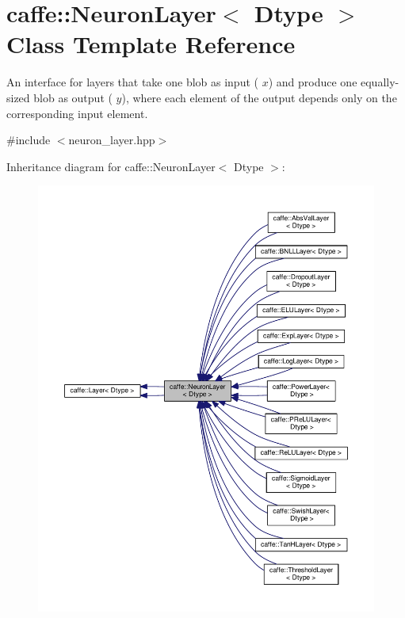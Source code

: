 \hypertarget{classcaffe_1_1_neuron_layer}{}\section{caffe\+:\+:Neuron\+Layer$<$ Dtype $>$ Class Template Reference}
\label{classcaffe_1_1_neuron_layer}


An interface for layers that take one blob as input ( $ x $) and produce one equally-\/sized blob as output ( $ y $), where each element of the output depends only on the corresponding input element.  




{\ttfamily \#include $<$neuron\+\_\+layer.\+hpp$>$}



Inheritance diagram for caffe\+:\+:Neuron\+Layer$<$ Dtype $>$\+:
\nopagebreak
\begin{figure}[H]
\begin{center}
\leavevmode
\includegraphics[width=350pt]{classcaffe_1_1_neuron_layer__inherit__graph}
\end{center}
\end{figure}
